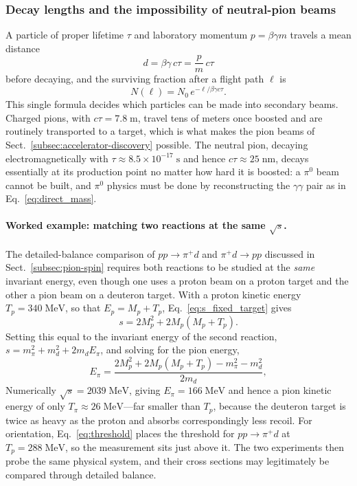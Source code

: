 \subsubsection{Decay lengths and the impossibility of neutral-pion beams}
\label{subsubsec:decay-length}

A particle of proper lifetime $\tau$ and laboratory momentum $p = \beta\gamma m$ travels
a mean distance
\begin{equation}
    d = \beta\gamma\, c\tau = \frac{p}{m}\,c\tau
    \label{eq:decay_length}
\end{equation}
before decaying, and the surviving fraction after a flight path $\ell$ is
\begin{equation}
    N(\ell) = N_0\, e^{-\ell / \beta\gamma c\tau}.
    \label{eq:survival}
\end{equation}
This single formula decides which particles can be made into secondary beams. Charged
pions, with $c\tau = 7.8\;\mathrm{m}$, travel tens of meters once boosted and are
routinely transported to a target, which is what makes the pion beams of
Sect.~\ref{subsec:accelerator-discovery} possible. The neutral pion, decaying
electromagnetically with $\tau \approx 8.5 \times 10^{-17}\;\mathrm{s}$ and hence
$c\tau \approx 25\;\mathrm{nm}$, decays essentially at its production point no matter
how hard it is boosted: a $\pi^0$ beam cannot be built, and $\pi^0$ physics must be done
by reconstructing the $\gamma\gamma$ pair as in Eq.~\eqref{eq:direct_mass}.

\paragraph{Worked example: matching two reactions at the same $\sqrt{s}$.}
The detailed-balance comparison of $pp \to \pi^+ d$ and $\pi^+ d \to pp$ discussed in
Sect.~\ref{subsec:pion-spin} requires both reactions to be studied at the \emph{same}
invariant energy, even though one uses a proton beam on a proton target and the other a
pion beam on a deuteron target. With a proton kinetic energy $T_p = 340\;\mathrm{MeV}$,
so that $E_p = M_p + T_p$, Eq.~\eqref{eq:s_fixed_target} gives
\begin{equation*}
    s = 2M_p^2 + 2 M_p (M_p + T_p).
\end{equation*}
Setting this equal to the invariant energy of the second reaction,
$s = m_\pi^2 + m_d^2 + 2 m_d E_\pi$, and solving for the pion energy,
\begin{equation}
    E_\pi = \frac{2M_p^2 + 2M_p(M_p + T_p) - m_\pi^2 - m_d^2}{2 m_d},
    \label{eq:detailed_balance_kinematics}
\end{equation}
Numerically $\sqrt{s} = 2039\;\mathrm{MeV}$, giving $E_\pi = 166\;\mathrm{MeV}$ and hence a
pion kinetic energy of only $T_\pi \approx 26\;\mathrm{MeV}$---far smaller than $T_p$,
because the deuteron target is twice as heavy as the proton and absorbs correspondingly
less recoil. For orientation, Eq.~\eqref{eq:threshold} places the threshold for
$pp \to \pi^+ d$ at $T_p = 288\;\mathrm{MeV}$, so the measurement sits just above it. The
two experiments then probe the same physical system, and their cross sections may
legitimately be compared through detailed balance.

